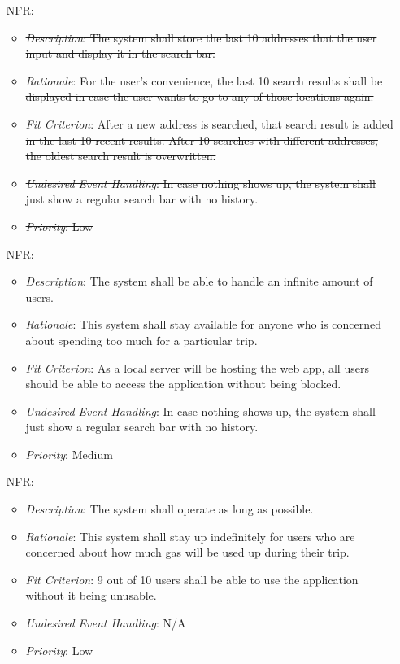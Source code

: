 \documentclass[12pt]{article}
\newcounter{nfrnum} %
\begin{document}
\begin{itemize}
\item[NFR\refstepcounter{nfrnum}\thenfrnum \label{NFR_12}:] 
\begin{itemize}
  \item \sout{\textit{Description}: The system shall store the last 10 addresses that the user input and display it in the search bar.}
  \item \sout{\textit{Rationale}: For the user’s convenience, the last 10 search results shall be displayed in case the user wants to go to any of those locations again.}
  \item \sout{\textit{Fit Criterion}: After a new address is searched, that search result is added in the last 10 recent results. After 10 searches with different addresses, the oldest search result is overwritten.}
  \item \sout{\textit{Undesired Event Handling}: In case nothing shows up, the system shall just show a regular search bar with no history.}
  \item \sout{\textit{Priority}: Low}
\end{itemize}

\item[NFR\refstepcounter{nfrnum}\thenfrnum \label{NFR_13}:] 
\begin{itemize}
  \item \textit{Description}: The system shall be able to handle an infinite amount of users.
  \item \textit{Rationale}: This system shall stay available for anyone who is concerned about spending too much for a particular trip.
  \item \textit{Fit Criterion}: As a local server will be hosting the web app, all users should be able to access the application without being blocked.
  \item \textit{Undesired Event Handling}: In case nothing shows up, the system shall just show a regular search bar with no history.
  \item \textit{Priority}: Medium
\end{itemize}

\item[NFR\refstepcounter{nfrnum}\thenfrnum \label{NFR_14}:] 
\begin{itemize}
  \item \textit{Description}: The system shall operate as long as possible.
  \item \textit{Rationale}: This system shall stay up indefinitely for users who are concerned about how much gas will be used up during their trip.
  \item \textit{Fit Criterion}: 9 out of 10 users shall be able to use the application without it being unusable.
  \item \textit{Undesired Event Handling}: N/A
  \item \textit{Priority}: Low
\end{itemize}


\end{itemize}
\end{document}
